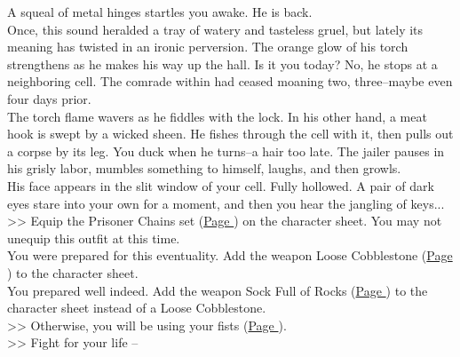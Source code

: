 A squeal of metal hinges startles you awake. He is back.\\

Once, this sound heralded a tray of watery and tasteless gruel, but lately its meaning has twisted in an ironic perversion. The orange glow of his torch strengthens as he makes his way up the hall. Is it you today? No, he stops at a neighboring cell. The comrade within had ceased moaning two, three--maybe even four days prior.\\

The torch flame wavers as he fiddles with the lock. In his other hand, a meat hook is swept by a wicked sheen. He fishes through the cell with it, then pulls out a corpse by its leg. You duck when he turns--a hair too late. The jailer pauses in his grisly labor, mumbles something to himself, laughs, and then growls.\\

His face appears in the slit window of your cell. Fully hollowed. A pair of dark eyes stare into your own for a moment, and then you hear the jangling of keys...\\

>> Equip the Prisoner Chains set (\hyperlink{Prisoner Chains}{Page \pageref*{Prisoner Chains}}) on the character sheet. You may not unequip this outfit at this time.\\
 You were prepared for this eventuality. Add the weapon Loose Cobblestone (\hyperlink{Loose Cobblestone}{Page \pageref*{Loose Cobblestone}}) to the character sheet.\\
 You prepared well indeed. Add the weapon Sock Full of Rocks (\hyperlink{Sock Full of Rocks}{Page \pageref*{Sock Full of Rocks}}) to the character sheet instead of a Loose Cobblestone.\\
>> Otherwise, you will be using your fists (\hyperlink{Fist}{Page \pageref*{Fist}}).\\

>> Fight for your life -- 